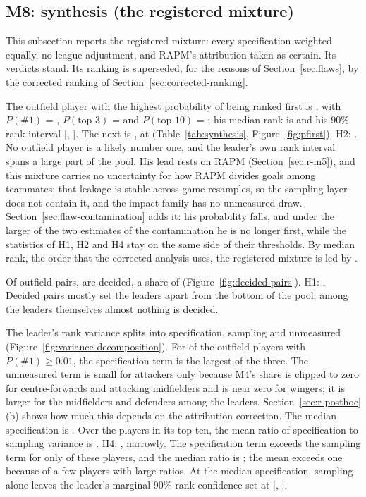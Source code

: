 \documentclass[11pt,a4paper]{article}
\begin{document}
\subsection{M8: synthesis (the registered mixture)}
\label{sec:r-m8}

This subsection reports the registered mixture: every specification weighted
equally, no league adjustment, and RAPM's attribution taken as certain. Its
verdicts stand. Its ranking is superseded, for the reasons of
Section~\ref{sec:flaws}, by the corrected ranking of
Section~\ref{sec:corrected-ranking}.

The outfield player with the highest probability of being ranked first is
\TopPlayerName{}, with $P(\#1)$ = \TopPlayerPFirst{}, $P(\text{top-3})$ =
\TopPlayerPTopThree{} and $P(\text{top-10})$ = \TopPlayerPTopTen{}; his median
rank is \TopPlayerMedianRank{} and his 90\% rank interval
[\TopPlayerRankLo, \TopPlayerRankHi]. The next is \SecondPlayerName{}, at
\SecondPlayerPFirst{} (Table~\ref{tab:synthesis}, Figure~\ref{fig:pfirst}).
H2: \VerdictHTwo{}. No outfield player is a likely number one, and the leader's own rank
interval spans a large part of the pool. His lead rests on RAPM
(Section~\ref{sec:r-m5}), and this mixture carries no uncertainty for how RAPM
divides goals among teammates: that leakage is stable across game resamples,
so the sampling layer does not contain it, and the impact family has no
unmeasured draw. Section~\ref{sec:flaw-contamination} adds it: his
probability falls, and under the larger of the two estimates of the
contamination he is no longer first, while the statistics of H1, H2 and H4
stay on the same side of their thresholds. By median rank, the order that the
corrected analysis uses, the registered mixture is led by
\RegisteredTopFive{}.

Of \NPairsOutfield{} outfield pairs, \NPairsDecided{} are decided, a share of
\SharePairsDecided{} (Figure~\ref{fig:decided-pairs}). H1: \VerdictHOne{}.
Decided pairs mostly set the leaders apart from the bottom of the pool; among
the leaders themselves almost nothing is decided.

The leader's rank variance splits into \TopPlayerVarSpec{} specification,
\TopPlayerVarSamp{} sampling and \TopPlayerVarUnm{} unmeasured
(Figure~\ref{fig:variance-decomposition}). For \NLeadersSpecLargest{} of the
\NLeaders{} outfield players with $P(\#1) \ge 0.01$, the specification term is
the largest of the three. The unmeasured term is small for attackers only
because M4's share is clipped to zero for centre-forwards and attacking
midfielders and is near zero for wingers; it is larger for the midfielders and
defenders among the leaders. Section~\ref{sec:r-posthoc} (b) shows how much
this depends on the attribution correction. The median specification is
\MedianSpecLabel{}. Over the \HFourNPlayers{} players in its top ten, the mean
ratio of specification to sampling variance is \HFourRatio{}. H4:
\VerdictHFour{}, narrowly. The specification term exceeds the sampling term
for only \HFourNSpecAbove{} of these players, and the median ratio is
\HFourMedianRatio{}; the mean exceeds one because of a few players with large
ratios. At the median specification, sampling alone leaves the leader's
marginal 90\% rank confidence set at [\TopPlayerMarginalLo, \TopPlayerMarginalHi].
\end{document}
